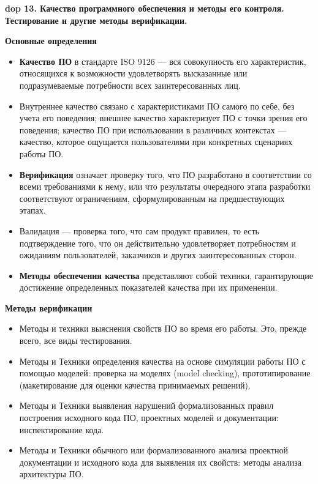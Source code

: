 \textbf{\LARGE dop 13. Качество программного обеспечения и методы его контроля. Тестирование и другие методы верификации.}

\textbf{Основные определения}
\begin{itemize}
    \item \textbf{Качество ПО} в стандарте ISO 9126 --- вся совокупность его характеристик, относящихся к возможности удовлетворять высказанные или подразумеваемые потребности всех заинтересованных лиц.
    \item Внутреннее качество связано с характеристиками ПО самого по себе, без учета его поведения; внешнее качество характеризует ПО с точки зрения его поведения; качество ПО при использовании в различных контекстах --- качество, которое ощущается пользователями при конкретных сценариях работы ПО.
    \item \textbf{Верификация} означает проверку того, что ПО разработано в соответствии со всеми требованиями к нему, или что результаты очередного этапа разработки соответствуют ограничениям, сформулированным на предшествующих этапах.
    \item Валидация --- проверка того, что сам продукт правилен, то есть подтверждение того, что он действительно удовлетворяет потребностям и ожиданиям пользователей, заказчиков и других заинтересованных сторон.
    \item \textbf{Методы обеспечения качества} представляют собой техники, гарантирующие достижение определенных показателей качества при их применении.
\end{itemize}

\textbf{Методы верификации}

\begin{itemize}
    \item Методы и техники выяснения свойств ПО во время его работы.
    Это, прежде всего, все виды тестирования.
    \item Методы и Техники определения качества на основе симуляции работы ПО с помощью моделей: проверка на моделях (model checking), прототипирование (макетирование для оценки качества принимаемых решений).
    \item Методы и Техники выявления нарушений формализованных правил построения исходного кода ПО, проектных моделей и документации: инспектирование кода.
    \item Методы и Техники обычного или формализованного анализа проектной документации и исходного кода для выявления их свойств: методы анализа архитектуры ПО.
\end{itemize}

